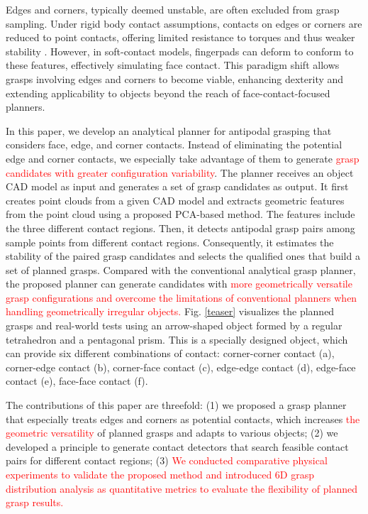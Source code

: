 \documentclass[journal]{IEEEtran}
\newcommand{\rev}[1]{\textcolor{red}{#1}}
\begin{document}
Edges and corners, typically deemed unstable, are often excluded from grasp sampling. Under rigid body contact assumptions, contacts on edges or corners are reduced to point contacts, offering limited resistance to torques and thus weaker stability \cite{bicchi2000robotic}. However, in soft-contact models, fingerpads can deform to conform to these features, effectively simulating face contact. This paradigm shift allows grasps involving edges and corners to become viable, enhancing dexterity and extending applicability to objects beyond the reach of face-contact-focused planners.

In this paper, we develop an analytical planner for antipodal grasping that considers face, edge, and corner contacts. Instead of eliminating the potential edge and corner contacts, we especially take advantage of them to generate \rev{grasp candidates with greater configuration variability}. The planner receives an object CAD model as input and generates a set of grasp candidates as output. It first creates point clouds from a given CAD model and extracts geometric features from the point cloud using a proposed PCA-based method. The features include the three different contact regions. Then, it detects antipodal grasp pairs among sample points from different contact regions. Consequently, it estimates the stability of the paired grasp candidates and selects the qualified ones that build a set of planned grasps. Compared with the conventional analytical grasp planner, the proposed planner can generate candidates with \rev{more geometrically versatile grasp configurations and overcome the limitations of conventional planners when handling geometrically irregular objects.} Fig. \ref{teaser} visualizes the planned grasps and real-world tests using an arrow-shaped object formed by a regular tetrahedron and a pentagonal prism. This is a specially designed object, which can provide six different combinations of contact: corner-corner contact (a), corner-edge contact (b), corner-face contact (c), edge-edge contact (d), edge-face contact (e), face-face contact (f).

The contributions of this paper are threefold: (1) we proposed a grasp planner that especially treats edges and corners as potential contacts, which increases \rev{the geometric versatility} of planned grasps and adapts to various objects; (2) we developed a principle to generate contact detectors that search feasible contact pairs for different contact regions; (3) \rev{We conducted comparative physical experiments to validate the proposed method and introduced 6D grasp distribution analysis as quantitative metrics to evaluate the flexibility of planned grasp results.}
\end{document}
